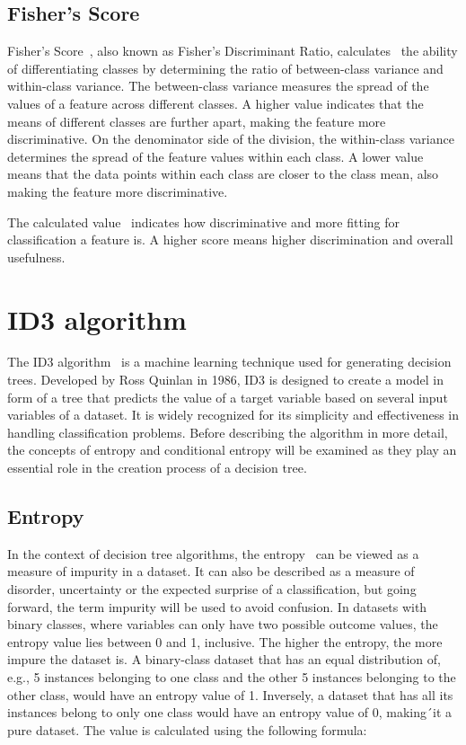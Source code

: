\subsection{Fisher's Score}
Fisher's Score~\cite{feature_selection}, also known as Fisher's Discriminant Ratio, calculates~\cite{8abf67a05c864edc85fbc3af89c826a8} the ability of differentiating classes by determining the ratio of between-class variance and within-class variance. The between-class variance measures the spread of the values of a feature across different classes. A higher value indicates that the means of different classes are further apart, making the feature more discriminative. On the denominator side of the division, the within-class variance determines the spread of the feature values within each class. A lower value means that the data points within each class are closer to the class mean, also making the feature more discriminative.

The calculated value~\cite{feature_selection} indicates how discriminative and more fitting for classification a feature is. A higher score means higher discrimination and overall usefulness.

\section{ID3 algorithm} \label{ID3}
The ID3 algorithm~\cite{id3_algorithm_wiki} is a machine learning technique used for generating decision trees. Developed by Ross Quinlan in 1986, ID3 is designed to create a model in form of a tree that predicts the value of a target variable based on several input variables of a dataset. It is widely recognized for its simplicity and effectiveness in handling classification problems. Before describing the algorithm in more detail, the concepts of entropy and conditional entropy will be examined as they play an essential role in the creation process of a decision tree.

\subsection{Entropy} \label{entropy}
In the context of decision tree algorithms, the entropy~\cite{entropy_dash} can be viewed as a measure of impurity in a dataset. It can also be described as a measure of disorder, uncertainty or the expected surprise of a classification, but going forward, the term impurity will be used to avoid confusion. In datasets with binary classes, where variables can only have two possible outcome values, the entropy value lies between 0 and 1, inclusive. The higher the entropy, the more impure the dataset is. A binary-class dataset that has an equal distribution of, e.g., 5 instances belonging to one class and the other 5 instances belonging to the other class, would have an entropy value of 1. Inversely, a dataset that has all its instances belong to only one class would have an entropy value of 0, making´it a pure dataset.
The value is calculated using the following formula:

